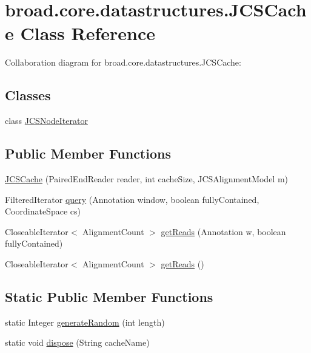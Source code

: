 \hypertarget{classbroad_1_1core_1_1datastructures_1_1_j_c_s_cache}{\section{broad.\+core.\+datastructures.\+J\+C\+S\+Cache Class Reference}
\label{classbroad_1_1core_1_1datastructures_1_1_j_c_s_cache}
}


Collaboration diagram for broad.\+core.\+datastructures.\+J\+C\+S\+Cache\+:
\subsection*{Classes}
\begin{DoxyCompactItemize}
\item 
class \hyperlink{classbroad_1_1core_1_1datastructures_1_1_j_c_s_cache_1_1_j_c_s_node_iterator}{J\+C\+S\+Node\+Iterator}
\end{DoxyCompactItemize}
\subsection*{Public Member Functions}
\begin{DoxyCompactItemize}
\item 
\hyperlink{classbroad_1_1core_1_1datastructures_1_1_j_c_s_cache_a210c4158f853efec66372c33229dc8a1}{J\+C\+S\+Cache} (Paired\+End\+Reader reader, int cache\+Size, J\+C\+S\+Alignment\+Model m)
\item 
Filtered\+Iterator \hyperlink{classbroad_1_1core_1_1datastructures_1_1_j_c_s_cache_a554654661a47ecf87a000581435d1eb2}{query} (Annotation window, boolean fully\+Contained, Coordinate\+Space cs)
\item 
Closeable\+Iterator$<$ Alignment\+Count $>$ \hyperlink{classbroad_1_1core_1_1datastructures_1_1_j_c_s_cache_a6f13ea81079bb23079fb1a5072298618}{get\+Reads} (Annotation w, boolean fully\+Contained)
\item 
Closeable\+Iterator$<$ Alignment\+Count $>$ \hyperlink{classbroad_1_1core_1_1datastructures_1_1_j_c_s_cache_aba7253cf42c957d9e361c30f4ed4e1f9}{get\+Reads} ()
\end{DoxyCompactItemize}
\subsection*{Static Public Member Functions}
\begin{DoxyCompactItemize}
\item 
static Integer \hyperlink{classbroad_1_1core_1_1datastructures_1_1_j_c_s_cache_afad1ffec78cbe93d6b122122aa08bc33}{generate\+Random} (int length)
\item 
static void \hyperlink{classbroad_1_1core_1_1datastructures_1_1_j_c_s_cache_a996c7c8e03ea133a890c8f93d53c5a1a}{dispose} (String cache\+Name)
\end{DoxyCompactItemize}


